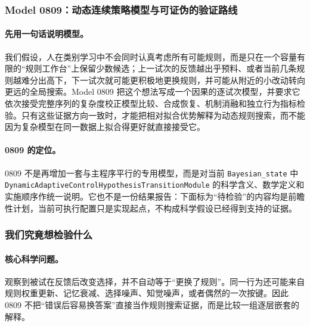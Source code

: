 
\subsubsection{Model 0809：动态连续策略模型与可证伪的验证路线}

\paragraph{先用一句话说明模型。}
我们假设，人在类别学习中不会同时认真考虑所有可能规则，而是只在一个容量有限的“规则工作台”上保留少数候选；上一试次的反馈越出乎预料、或者当前几条规则越难分出高下，下一试次就可能更积极地更换规则，并可能从附近的小改动转向更远的全局搜索。Model 0809 把这个想法写成一个因果的逐试次模型，并要求它依次接受完整序列的复杂度校正模型比较、合成恢复、机制消融和独立行为指标检验。只有这些证据方向一致时，才能把相对拟合优势解释为动态规则搜索，而不能因为复杂模型在同一数据上拟合得更好就直接接受它。

\paragraph{0809 的定位。}
0809 不是再增加一套与主程序平行的专用模型，而是对当前
\texttt{Bayesian\_state} 中
\texttt{DynamicAdaptiveControlHypothesisTransitionModule} 的科学含义、数学定义和实施顺序作统一说明。它也不是一份结果报告：下面标为“待检验”的内容均是前瞻性计划，当前可执行配置只是实现起点，不构成科学假设已经得到支持的证据。


\subsubsection{我们究竟想检验什么}

\paragraph{核心科学问题。}
观察到被试在反馈后改变选择，并不自动等于“更换了规则”。同一行为还可能来自规则权重更新、记忆衰减、选择噪声、知觉噪声，或者偶然的一次按键。因此 0809 不把“错误后容易换答案”直接当作规则搜索证据，而是比较一组逐层嵌套的解释。

